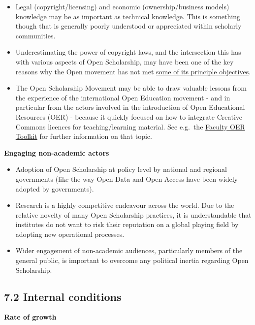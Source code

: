 \begin{itemize}
\item
  Legal (copyright/licensing) and economic (ownership/business models)
  knowledge may be as important as technical knowledge. This is
  something though that is generally poorly understood or appreciated
  within scholarly communities.
\item
  Underestimating the power of copyright laws, and the intersection this
  has with various aspects of Open Scholarship, may have been one of the
  key reasons why the Open movement has not met
  \href{https://poynder.blogspot.com/2017/02/copyright-immoveable-barrier-that-open.html}{some
  of its principle objectives}.
\item
  The Open Scholarship Movement may be able to draw valuable lessons
  from the experience of the international Open Education movement - and
  in particular from the actors involved in the introduction of Open
  Educational Resources (OER) - because it quickly focused on how to
  integrate Creative Commons licences for teaching/learning material.
  See e.g.~the
  \href{https://pressbooks.bccampus.ca/facultyoertoolkit/}{Faculty OER
  Toolkit} for further information on that topic.
\end{itemize}

\textbf{Engaging non-academic actors}

\begin{itemize}
\item
  Adoption of Open Scholarship at policy level by national and regional
  governments (like the way Open Data and Open Access have been widely
  adopted by governments).
\item
  Research is a highly competitive endeavour across the world. Due to
  the relative novelty of many Open Scholarship practices, it is
  understandable that institutes do not want to risk their reputation on
  a global playing field by adopting new operational processes.
\item
  Wider engagement of non-academic audiences, particularly members of
  the general public, is important to overcome any political inertia
  regarding Open Scholarship.
\end{itemize}

\subsection{7.2 Internal conditions }\label{internal-conditions}

\textbf{Rate of growth}

